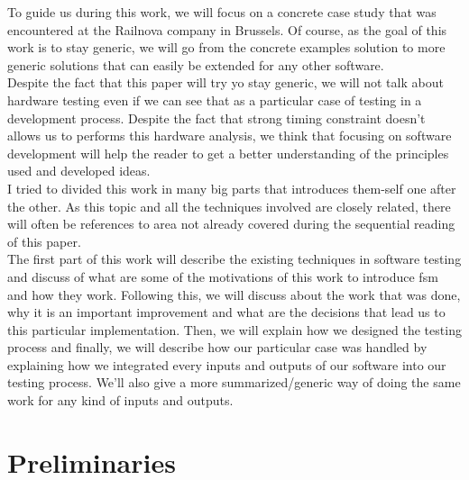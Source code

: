 \documentclass[12pt]{article}
\theoremstyle{definition}
\theoremstyle{definition}
\begin{document}
To guide us during this work, we will focus on a concrete case study that was encountered at the Railnova company in Brussels. Of course, as the goal of this work is to stay generic, we will go from the concrete examples solution to more generic solutions that can easily be extended for any other software.\\

Despite the fact that this paper will try yo stay generic, we will not talk about hardware testing even if we can see that as a particular case of testing in a development process. Despite the fact that strong timing constraint doesn't allows us to performs this hardware analysis, we think that focusing on software development will help the reader to get a better understanding of the principles used and developed ideas.\\

I tried to divided this work in many big parts that introduces them-self one after the other. As this topic and all the techniques involved are closely related, there will often be references to area not already covered during the sequential reading of this paper.\\

The first part of this work will describe the existing techniques in software testing and discuss of what are some of the motivations of this work to introduce \gls{fsm} and how they work. Following this, we will discuss about the work that was done, why it is an important improvement and what are the decisions that lead us to this particular implementation. Then, we will explain how we designed the testing process and finally, we will describe how our particular case was handled by explaining how we integrated every inputs and outputs of our software into our testing process. We'll also give a more summarized/generic way of doing the same work for any kind of inputs and outputs.



\clearpage
\part{Preliminaries}
\end{document}
